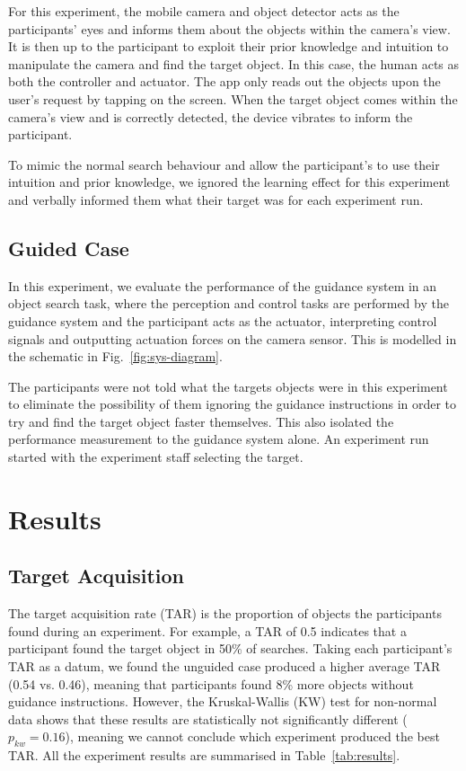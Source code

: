 \documentclass[runningheads]{llncs}
\begin{document}
For this experiment, the mobile camera and object detector acts as the participants' eyes and informs them about the objects within the camera's view.
It is then up to the participant to exploit their prior knowledge and intuition to manipulate the camera and find the target object. 
In this case, the human acts as both the controller and actuator. 
The app only reads out the objects upon the user's request by tapping on the screen. 
When the target object comes within the camera's view and is correctly detected, the device vibrates to inform the participant. 

To mimic the normal search behaviour and allow the participant's to use their intuition and prior knowledge, we ignored the learning effect for this experiment and verbally informed them what their target was for each experiment run.

\subsection{Guided Case}

In this experiment, we evaluate the performance of the guidance system in an object search task, where the perception and control tasks are performed by the guidance system and the participant acts as the actuator, interpreting control signals and outputting actuation forces on the camera sensor. 
This is modelled in the schematic in Fig.~\ref{fig:sys-diagram}. 

The participants were not told what the targets objects were in this experiment to eliminate the possibility of them ignoring the guidance instructions in order to try and find the target object faster themselves.
This also isolated the performance measurement to the guidance system alone.
An experiment run started with the experiment staff selecting the target.

\section{Results}\label{sec:results}

\subsection{Target Acquisition}

The target acquisition rate (TAR) is the proportion of objects the participants found during an experiment. 
For example, a TAR of 0.5 indicates that a participant found the target object in 50\% of searches. 
Taking each participant's TAR as a datum, we found the unguided case produced a higher average TAR (0.54 vs. 0.46), meaning that participants found 8\% more objects without guidance instructions.
However, the Kruskal-Wallis (KW) test for non-normal data shows that these results are statistically not significantly different ($p_{kw} = 0.16$), meaning we cannot conclude which experiment produced the best TAR. 
All the experiment results are summarised in Table~\ref{tab:results}. 
\end{document}
